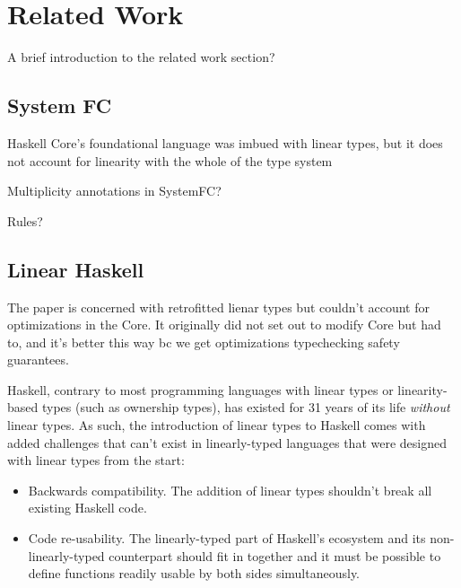 \documentclass[]{lwnovathesis}
\begin{document}

\section{Related Work}

A brief introduction to the related work section?

\subsection{System FC}

Haskell Core's foundational language was imbued with linear types, but it does
not account for linearity with the whole of the type system

Multiplicity annotations in SystemFC?

Rules?

\subsection{Linear Haskell\label{sec:related-work-linear-haskell}}

The paper is concerned with retrofitted lienar types but couldn't account for
optimizations in the Core. It originally did not set out to modify Core but had
to, and it's better this way bc we get optimizations typechecking safety
guarantees.

Haskell, contrary to most programming languages with linear types or
linearity-based types (such as ownership types), has existed for 31 years of its
life \emph{without} linear types. As such, the introduction of linear types to
Haskell comes with added challenges that can't exist in linearly-typed languages
that were designed with linear types from the start:

\begin{itemize}
    \item Backwards compatibility. The addition of linear types shouldn't break
        all existing Haskell code.
    \item Code re-usability. The linearly-typed part of Haskell's ecosystem and
        its non-linearly-typed counterpart should fit in together and it must be
        possible to define functions readily usable by both sides
        simultaneously.
\end{itemize}
\end{document}
